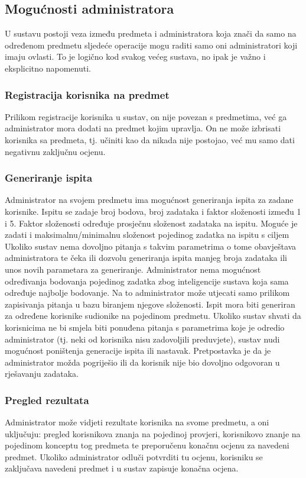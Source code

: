 \documentclass[times, utf8, zavrsni, numeric]{fer}
\begin{document}
\subsection{Mogućnosti administratora}
U sustavu postoji veza između predmeta i administratora koja znači da samo na određenom predmetu sljedeće operacije mogu raditi samo oni administratori koji imaju ovlasti. To je logično kod svakog većeg sustava, no ipak je važno i eksplicitno napomenuti.

\subsubsection{Registracija korisnika na predmet}
Prilikom registracije korisnika u sustav, on nije povezan s predmetima, već ga administrator mora dodati na predmet kojim upravlja. On ne može izbrisati korisnika sa predmeta, tj. učiniti kao da nikada nije postojao, već mu samo dati negativnu zaključnu ocjenu.

\subsubsection{Generiranje ispita}
Administrator na svojem predmetu ima mogućnost generiranja ispita za zadane korisnike. Ispitu se zadaje broj bodova, broj zadataka i faktor složenosti između 1 i 5. Faktor složenosti određuje prosječnu složenost zadataka na ispitu. Moguće je zadati i maksimalnu/minimalnu složenost pojedinog zadatka na ispitu s ciljem 
Ukoliko sustav nema dovoljno pitanja s takvim parametrima o tome obavještava administratora te čeka ili dozvolu generiranja ispita manjeg broja zadataka ili unos novih parametara za generiranje.
Administrator nema mogućnost određivanja bodovanja pojedinog zadatka zbog inteligencije sustava koja sama određuje najbolje bodovanje. Na to administrator može utjecati samo prilikom zapisivanja pitanja u bazu biranjem njegove složenosti.
Ispit mora biti generiran za određene korisnike sudionike na pojedinom predmetu. Ukoliko sustav shvati da korisnicima ne bi smjela biti ponuđena pitanja s parametrima koje je odredio administrator (tj. neki od korisnika nisu zadovoljili preduvjete), sustav nudi mogućnost poništenja generacije ispita ili nastavak. Pretpostavka je da je administrator možda pogriješio ili da korisnik nije bio dovoljno odgovoran u rješavanju zadataka.

\subsubsection{Pregled rezultata}
Administrator može vidjeti rezultate korisnika na svome predmetu, a oni uključuju: pregled korisnikova znanja na pojedinoj provjeri, korisnikovo znanje na pojedinom konceptu tog predmeta te preporučenu konačnu ocjenu za navedeni predmet.
Ukoliko administrator odluči potvrditi tu ocjenu, korisniku se zaključava navedeni predmet i u sustav zapisuje konačna ocjena.
\end{document}

